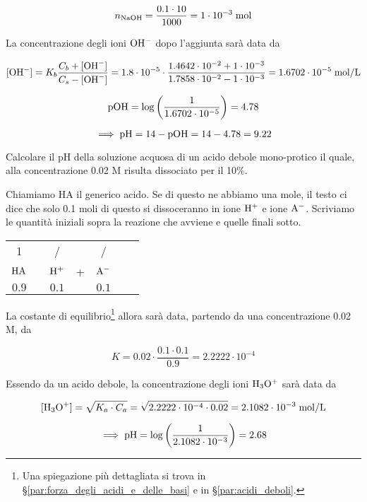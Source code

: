 \begin{soluzione}
$$n_{\rm NaOH}=\frac{0.1 \cdot 10}{1000}=1 \cdot 10^{-3} \; \rm mol$$

La concentrazione degli ioni $\rm OH^-$ dopo l'aggiunta sarà data da

$${[\text{OH}^-]}=K_b \frac{C_b + {[\text{OH}^-]}}{C_s - \rm{[\text{OH}^-]}}
=1.8 \cdot 10^{-5} \cdot \frac{1.4642 \cdot 10^{-2} + 1 \cdot 10^{-3}}{1.7858 \cdot 10^{-2} - 1 \cdot 10^{-3}}
=1.6702 \cdot 10^{-5} \; \rm mol/L$$

$$\rm pOH=\log \left( \frac{1}{1.6702 \cdot 10^{-5}} \right)=4.78$$

$$\implies \rm pH=14-pOH=14-4.78=9.22$$

\end{soluzione}

\newpage

\begin{esercizio}
    Calcolare il pH della soluzione acquosa di un acido debole mono-protico il quale, alla concentrazione 0.02 M risulta dissociato per il 10\%.
\end{esercizio}
\begin{soluzione}
    Chiamiamo HA il generico acido. Se di questo ne abbiamo una mole, il testo ci dice che solo 0.1 moli di questo si dissoceranno in ione $\rm H^+$ e ione $\rm A^-$. Scriviamo le quantità iniziali sopra la reazione che avviene e quelle finali sotto.

\begin{center}
    \begin{tabular}{ccccccc}
        1 & & / & & /\\
        $\rm HA$ & \ce{<-->} & $\rm H^+$ & + & $\rm A^-$\\
        $0.9$ & & $0.1$ & & $0.1$\\
    \end{tabular}
\end{center}

La costante di equilibrio\footnote{Una spiegazione più dettagliata si trova in §\ref{par:forza_degli_acidi_e_delle_basi} e in §\ref{par:acidi_deboli}.} allora sarà data, partendo da una concentrazione 0.02 M, da

$$K=0.02 \cdot \frac{0.1 \cdot 0.1}{0.9}=2.2222 \cdot 10^{-4}$$

Essendo da un acido debole, la concentrazione degli ioni $\rm H_3O^+$ sarà data da

$$[\text{H}_3\text{O}^+] = \sqrt{K_a \cdot C_a}
=\sqrt{2.2222 \cdot 10^{-4} \cdot 0.02}=2.1082 \cdot 10^{-3}\; \rm mol/L$$

$$\implies \rm pH=\log{\left(\frac{1}{2.1082 \cdot 10^{-3}}\right)}=2.68$$
\end{soluzione}

